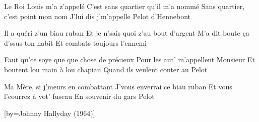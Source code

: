 \endverse

\beginverse
Le Roi Louis m'a z'appelé
C'est sans quartier qu'il m'a nommé
Sans quartier, c'est point mon nom
J'lui dis j'm'appelle Pelot d'Hennebont
\endverse

\beginverse
Il a quéri z'un biau ruban
Et je n'sais quoi z'au bout d'argent
M'a dit boute ça d'ssus ton habit
Et combats toujours l'ennemi
\endverse

\beginverse
Faut qu'ce soye que que chose de précieux
Pour les aut' m'appellent Monsieur
Et boutent lou main à lou chapiau
Quand ils veulent conter au Pelot
\endverse

\beginverse
Ma Mère, si j'meurs en combattant
J'vous enverrai ce biau ruban
Et vous l'courrez à vot' fuseau
En souvenir du gars Pelot
\endverse

\endsong
{}[by={Johnny Hallyday (1964)}]

\]\]\]\]\]\]\]\]\]\]\]\]\]\]\]\]\]\]\]\]\]\]\]\]\]\]\]\]\]\]\]\]\]\]\]\]\]\]\]\]\]\]\]\]\]\]\]\]\]\]\]\]\]\]\]\]\]\]\]\]\]\]\]\]\]\]\]\]\]\]\]\]\]\]\]\]\]\]\]\]\]\]\]\]\]\]\]\]\]\]\]\]\]\]\]\]\]\]\]\]\]\]\]\]\]\]\]\]\]\]\]\]\]\]\]\]\]\]\]\]\]\]\]\]\]\]\]\]\]\]\]\]\]\]\]\]\]\]\]\]\]\]\]\]\]\]\]\]\]\]\]\]\]\]\]\]\]\]\]\]\]\]\]\]\]\]\]\]\]\]\]\]\]\]\]\]\]\]\]\]\]\]\]\]\]\]\]\]\]\]\]\]\]\]\]\]\]\]\]\]\]\]\]\]\]\]\]\]\]\]\]\]\]\]\]\]\]\]\]\]\]\]\]\]\]\]\]\]\]\]\]\]\]\]\]\]\]\]\]\]\]\]\]\]\]\]\]\]\]\]\]\]\]\]\]\]\]\]\]\]\]\]\]\]\]\]\]\]\]\]\]\]\]\]\]\]\]\]\]\]\]\]\]\]\]\]\]\]\]\]\]\]\]\]\]\]\]\]\]\]\]\]\]\]\]\]\]\]\]\]\]\]\]\]\]\]\]\]\]\]\]\]\]\]\]\]\]\]\]\]\]\]\]\]\]\]\]\]\]\]\]\]\]\]\]\]\]\]\]\]\]\]\]\]\]\]\]\]\]\]\]\]\]\]\]\]\]\]\]\]\]\]\]\]\]\]\]\]\]\]\]\]\]\]\]\]\]\]\]\]\]\]\]\]\]\]\]\]\]\]\]\]\]\]\]\]\]\]\]\]\]\]\]\]\]\]\]\]\]\]\]\]\]\]\]\]\]\]\]\]\]\]\]\]\]\]\]\]\]\]\]\]\]\]\]\]\]\]\]\]\]\]\]\]\]\]\]\]\]\]\]\]\]\]\]\]\]\]\]\]\]\]\]\]\]\]\]\]\]\]\]\]\]\]\]\]\]\]\]\]\]\]\]\]\]\]\]\]\]\]\]\]\]\]\]\]\]\]\]\]\]\]\]\]\]\]\]\]\]\]\]\]\]\]\]\]\]\]\]\]\]\]\]\]\]\]\]\]\]\]\]\]\]\]\]\]\]\]\]\]\]\]\]\]\]\]\]\]\]\]\]\]\]\]\]\]\]\]\]\]\]\]\]\]\]\]\]\]\]\]\]\]\]\]\]\]\]\]\]\]\]\]\]\]\]\]\]\]\]\]\]\]\]\]\]\]\]\]\]\]\]\]\]\]\]\]\]\]\]\]\]\]\]\]\]\]\]\]\]\]\]\]\]\]\]\]\]\]\]\]\]\]\]\]\]\]\]\]\]\]\]\]\]\]\]\]\]\]\]\]\]\]\]\]\]\]\]\]\]\]\]\]\]\]\]\]\]\]\]\]\]\]\]\]\]\]\]\]\]\]\]\]\]\]\]\]\]\]\]\]\]\]\]\]\]\]\]\]\]\]\]\]\]\]\]\]\]\]\]\]\]\]\]\]\]\]\]\]\]\]\]\]\]\]\]\]\]\]\]\]\]\]\]\]\]\]\]\]\]\]\]\]\]\]\]\]\]\]\]\]\]\]\]\]\]\]\]\]\]\]\]\]\]\]\]\]\]\]\]\]\]\]\]\]\]\]\]\]\]\]\]\]\]\]\]\]\]\]\]\]\]\]\]\]\]\]\]\]\]\]\]\]\]\]\]\]\]\]\]\]\]\]\]\]\]\]\]\]\]\]\]\]\]\]\]\]\]\]\]\]\]\]\]\]\]\]\]\]\]\]\]\]\]\]\]\]\]\]\]\]\]\]\]\]\]\]\]\]\]\]\]\]\]\]\]\]\]\]\]\]\]\]\]\]\]\]\]\]\]\]\]\]\]\]\]\]\]\]\]\]\]\]\]\]\]\]\]\]\]\]\]\]\]\]\]\]\]\]\]\]\]\]\]\]\]\]\]\]\]\]\]\]\]\]\]\]\]\]\]\]\]\]\]\]\]\]\]\]\]\]\]\]\]\]\]\]\]\]\]\]\]\]\]\]\]\]\]\]\]\]\]\]\]\]\]\]\]\]\]\]\]\]\]\]\]\]\]\]\]\]\]\]\]\]\]\]\]\]\]\]\]\]\]\]\]\]\]\]\]\]\]\]\]\]\]\]\]\]\]\]\]\]\]\]\]\]\]\]\]\]\]\]\]\]\]\]\]\]\]\]\]\]\]\]\]\]\]\]\]\]\]\]\]\]\]\]\]\]\]\]\]\]\]\]\]\]\]\]\]\]\]\]\]\]\]\]\]\]\]\]\]\]\]\]\]\]\]\]\]\]\]\]\]\]\]\]\]\]\]\]\]\]\]\]\]\]\]\]\]\]\]\]\]\]\]\]\]\]\]\]\]\]\]\]\]\]\]\]\]\]\]\]\]\]\]\]\]\]\]\]\]\]\]\]\]\]\]\]\]\]\]\]\]\]\]\]\]\]\]\]\]\]\]\]\]\]\]\]\]\]\]\]\]\]\]\]\]\]\]\]\]\]\]\]\]\]\]\]\]\]\]\]\]\]\]\]\]\]\]\]\]\]\]\]\]\]\]\]\]\]\]\]\]\]\]
